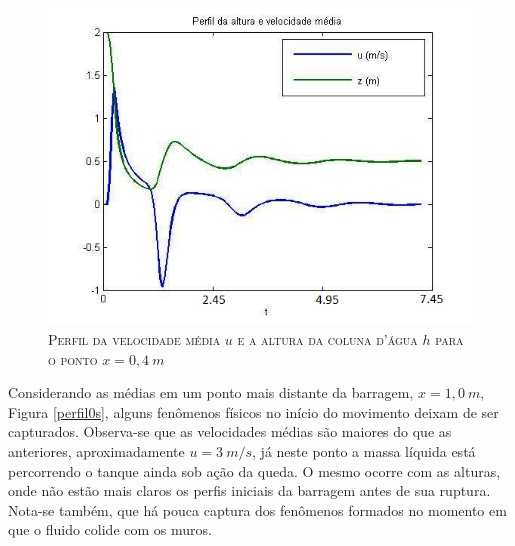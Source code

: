  \begin{figure}[H]
 	\centering
 	\includegraphics[scale=1]{figuras/perfil04s.jpg}
 	\caption{\textsc{Perfil da velocidade média $u$ e a altura da coluna d'água $h$ para o ponto $x=0,4 \ m$} }
 	\vspace{-0.1cm}
 	\label{perfil04s}
 \end{figure}
 
 Considerando as médias em um ponto mais distante da barragem,  $x= 1,0 \ m$, Figura \ref{perfil0s}, alguns fenômenos físicos no início do movimento deixam de ser capturados. Observa-se que as velocidades médias são maiores do que as anteriores, aproximadamente $u=3 \ m/s$, já neste ponto a massa líquida está percorrendo o tanque ainda sob ação da queda. O mesmo ocorre com as alturas, onde não estão mais claros os perfis iniciais da barragem antes de sua ruptura. Nota-se também, que há pouca captura dos fenômenos formados no momento em que o fluido colide com os muros.
 

